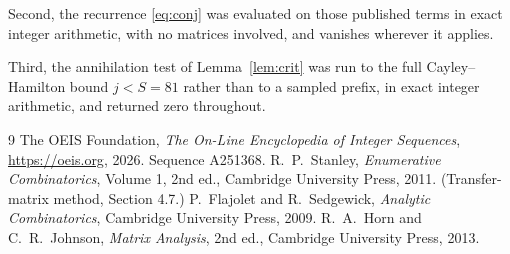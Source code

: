 \documentclass[11pt,a4paper]{article}
\theoremstyle{plain}
\theoremstyle{definition}
\begin{document}
Second, the recurrence \eqref{eq:conj} was evaluated on those published terms in exact
integer arithmetic, with no matrices involved, and vanishes wherever it applies.

Third, the annihilation test of Lemma~\ref{lem:crit} was run to the full Cayley--Hamilton
bound $j<S=81$ rather than to a sampled prefix, in exact integer arithmetic, and returned
zero throughout.

\begin{thebibliography}{9}
 The OEIS Foundation, \emph{The On-Line Encyclopedia of Integer
Sequences}, \url{https://oeis.org}, 2026. Sequence A251368.
 R.~P.~Stanley, \emph{Enumerative Combinatorics}, Volume 1, 2nd ed.,
Cambridge University Press, 2011. (Transfer-matrix method, Section 4.7.)
 P.~Flajolet and R.~Sedgewick, \emph{Analytic Combinatorics}, Cambridge
University Press, 2009.
 R.~A.~Horn and C.~R.~Johnson, \emph{Matrix Analysis}, 2nd ed., Cambridge
University Press, 2013.
\end{thebibliography}
\end{document}
